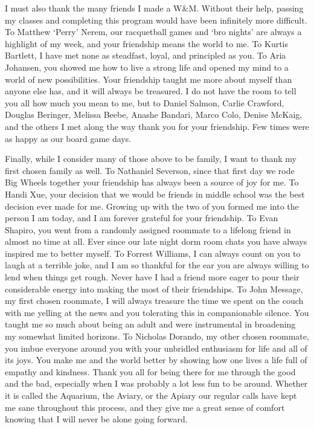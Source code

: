 \documentclass[../main.tex]{subfiles}
\begin{document}
\begin{singlespace}
{{I must also thank the many friends I made a W$\&$M. Without their help, passing my classes and completing this program would have been infinitely more difficult. To Matthew `Perry' Nerem, our racquetball games and `bro nights' are always a highlight of my week, and your friendship means the world to me. To Kurtis Bartlett, I have met none as steadfast, loyal, and principled as you. To Aria Johansen, you showed me how to live a strong life and opened my mind to a world of new possibilities. Your friendship taught me more about myself than anyone else has, and it will always be treasured. I do not have the room to tell you all how much you mean to me, but to Daniel Salmon, Carlie Crawford, Douglas Beringer, Melissa Beebe, Anashe Bandari, Marco Colo, Denise McKaig, and the others I met along the way thank you for your friendship. Few times were as happy as our board game days.\\

} %

{\parindent0pt %
                                                                                 
Finally, while I consider many of those above to be family, I want to thank my first chosen family as well. To Nathaniel Severson, since that first day we rode Big Wheels together your friendship has always been a source of joy for me. To Handi Xue, your decision that we would be friends in middle school was the best decision ever made for me. Growing up with the two of you formed me into the person I am today, and I am forever grateful for your friendship. To Evan Shapiro, you went from a randomly assigned roommate to a lifelong friend in almost no time at all. Ever since our late night dorm room chats you have always inspired me to better myself. To Forrest Williams, I can always count on you to laugh at a terrible joke, and I am so thankful for the ear you are always willing to lend when things get rough. Never have I had a friend more eager to pour their considerable energy into making the most of their friendships. To John Message, my first chosen roommate, I will always treasure the time we spent on the couch with me yelling at the news and you tolerating this in companionable silence. You taught me so much about being an adult and were instrumental in broadening my somewhat limited horizons. To Nicholas Dorando, my other chosen roommate, you imbue everyone around you with your unbridled enthusiasm for life and all of its joys. You make me and the world better by showing how one lives a life full of empathy and kindness. Thank you all for being there for me through the good and the bad, especially when I was probably a lot less fun to be around. Whether it is called the Aquarium, the Aviary, or the Apiary our regular calls have kept me sane throughout this process, and they give me a great sense of comfort knowing that I will never be alone going forward.\\

}}
\end{singlespace}
\end{document}
